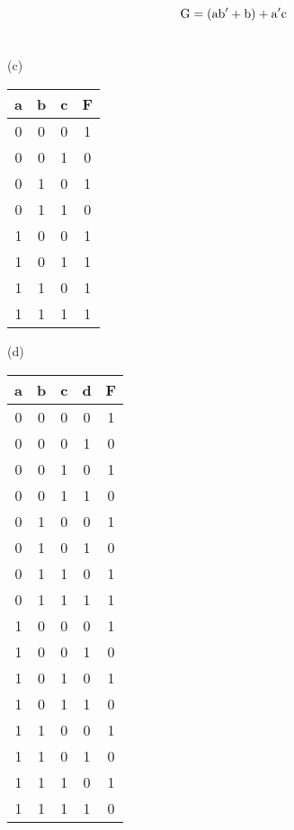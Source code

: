 \documentclass{article}
\begin{document}
\section{}
$$\rm G=(ab'+b)+a'c$$

\section{}
\begin{minipage}{0.48\linewidth}
	(c)\\
	\begin{center}
	\begin{tabular}{ccc|c}
	a&b&c&F\\\hline
	0&0&0&1\\
	0&0&1&0\\
	0&1&0&1\\
	0&1&1&0\\
	1&0&0&1\\
	1&0&1&1\\
	1&1&0&1\\
	1&1&1&1\\
	\end{tabular}
	\end{center}
\end{minipage}
\hfill
\begin{minipage}{0.48\linewidth}
	(d)\\
	\begin{center}
	\begin{tabular}{cccc|c}
	a&b&c&d&F\\\hline
	0&0&0&0&1\\
	0&0&0&1&0\\
	0&0&1&0&1\\
	0&0&1&1&0\\
	0&1&0&0&1\\
	0&1&0&1&0\\
	0&1&1&0&1\\
	0&1&1&1&1\\
	1&0&0&0&1\\
	1&0&0&1&0\\
	1&0&1&0&1\\
	1&0&1&1&0\\
	1&1&0&0&1\\
	1&1&0&1&0\\
	1&1&1&0&1\\
	1&1&1&1&0\\
	\end{tabular}
	\end{center}
\end{minipage}
\end{document}
